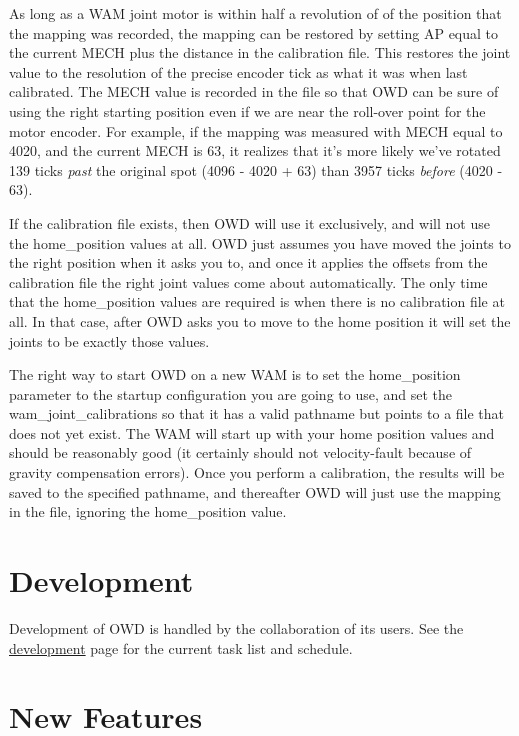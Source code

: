 \begin{DoxyItemize}
\item As long as a W\-A\-M joint motor is within half a revolution of of the position that the mapping was recorded, the mapping can be restored by setting A\-P equal to the current M\-E\-C\-H plus the distance in the calibration file. This restores the joint value to the resolution of the precise encoder tick as what it was when last calibrated. The M\-E\-C\-H value is recorded in the file so that O\-W\-D can be sure of using the right starting position even if we are near the roll-\/over point for the motor encoder. For example, if the mapping was measured with M\-E\-C\-H equal to 4020, and the current M\-E\-C\-H is 63, it realizes that it's more likely we've rotated 139 ticks {\itshape past} the original spot (4096 -\/ 4020 + 63) than 3957 ticks {\itshape before} (4020 -\/ 63).
\item If the calibration file exists, then O\-W\-D will use it exclusively, and will not use the home\-\_\-position values at all. O\-W\-D just assumes you have moved the joints to the right position when it asks you to, and once it applies the offsets from the calibration file the right joint values come about automatically. The only time that the home\-\_\-position values are required is when there is no calibration file at all. In that case, after O\-W\-D asks you to move to the home position it will set the joints to be exactly those values.
\item The right way to start O\-W\-D on a new W\-A\-M is to set the home\-\_\-position parameter to the startup configuration you are going to use, and set the wam\-\_\-joint\-\_\-calibrations so that it has a valid pathname but points to a file that does not yet exist. The W\-A\-M will start up with your home position values and should be reasonably good (it certainly should not velocity-\/fault because of gravity compensation errors). Once you perform a calibration, the results will be saved to the specified pathname, and thereafter O\-W\-D will just use the mapping in the file, ignoring the home\-\_\-position value.
\end{DoxyItemize}\hypertarget{index_develoment}{}\section{Development}\label{index_develoment}
Development of O\-W\-D is handled by the collaboration of its users. See the \hyperlink{development}{development} page for the current task list and schedule.\hypertarget{index_owdnews}{}\section{New Features}\label{index_owdnews}
